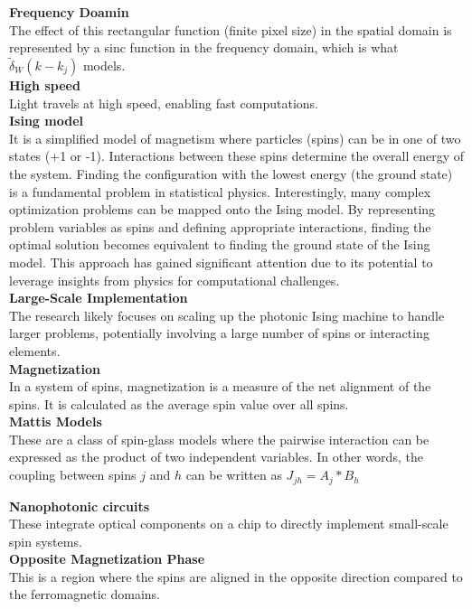 \textbf{Frequency Doamin} \\ 
The effect of this rectangular function (finite pixel size) in the spatial domain is represented by a sinc function in the frequency domain, which is what $\tilde{\delta}_W (k - k_j)$ models. \\
 
\textbf{High speed} \\
Light travels at high speed, enabling fast computations.\\

\textbf{Ising model} \\
It is a simplified model of magnetism where particles (spins) can be in one of two states (+1 or -1). Interactions between these spins determine the overall energy of the system. Finding the configuration with the lowest energy (the ground state) is a fundamental problem in statistical physics. Interestingly, many complex optimization problems can be mapped onto the Ising model. By representing problem variables as spins and defining appropriate interactions, finding the optimal solution becomes equivalent to finding the ground state of the Ising model. This approach has gained significant attention due to its potential to leverage insights from physics for computational challenges.\\

\textbf{Large-Scale Implementation}\\
The research likely focuses on scaling up the photonic Ising machine to handle larger problems, potentially involving a large number of spins or interacting elements. \\

\textbf{Magnetization}\\
In a system of spins, magnetization is a measure of the net alignment of the spins. It is calculated as the average spin value over all spins. \\

\textbf{Mattis Models}\\
These are a class of spin-glass models where the pairwise interaction can be expressed as the product of two independent variables. In other words, the coupling between spins $j$ and $h$ can be written as $J_{jh} = A_j * B_h$

\textbf{Nanophotonic circuits} \\
These integrate optical components on a chip to directly implement small-scale spin systems.\\

\textbf{Opposite Magnetization Phase} \\
This is a region where the spins are aligned in the opposite direction compared to the ferromagnetic domains. \\

